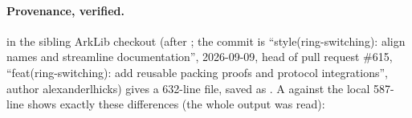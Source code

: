 \paragraph{Provenance, verified.} \allowbreak{}\allowbreak{}\allowbreak{}\allowbreak{}\allowbreak{}\allowbreak{}
in the sibling ArkLib checkout (after ; the commit is \enquote{style(ring-switching):
align names and streamline documentation}, 2026-09-09, head of pull request \#615,
\enquote{feat(ring-switching): add reusable packing proofs and protocol integrations}, author
alexanderlhicks) gives a 632-line file, saved as
\allowbreak{}\allowbreak{}. A  against the local
587-line \allowbreak{}\allowbreak{}\allowbreak{} shows exactly these differences
(the whole  output was read):
